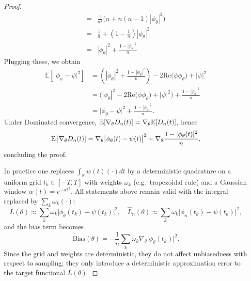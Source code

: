 \begin{proof}
\begin{align*}
=&
\frac{1}{n^2}\Big( n + n(n-1) |\phi_\theta|^2 \Big)\\
=&
\frac{1}{n} + \left(1-\frac{1}{n}\right)|\phi_\theta|^2\\
=&
|\phi_\theta|^2 + \frac{1-|\phi_\theta|^2}{n}
\end{align*}
Plugging these, we obtain
\begin{align*}
\mathbb{E}\left[ \big|\phi_n - \psi\big|^2 \right]
&=
\left( |\phi_\theta|^2 + \frac{1-|\phi_\theta|^2}{n} \right)
-
2\mathrm{Re}\big( \overline{\psi}\phi_\theta \big)
+
|\psi|^2
\\[4pt]
&=
\big( |\phi_\theta|^2 - 2\mathrm{Re}\big( \overline{\psi}\phi_\theta \big) + |\psi|^2 \big)
+
\frac{1-|\phi_\theta|^2}{n}
\\[4pt]
&=
\big|\phi_\theta - \psi\big|^2 + \frac{1-|\phi_\theta|^2}{n}.
\end{align*} 
Under Dominated convergence, $\mathbb{E}[\nabla_\theta D_n(t)] = \nabla_\theta \mathbb{E}[D_n(t)]$, hence
\[
\mathbb{E}\left[\nabla_\theta D_n(t)\right]
= \nabla_\theta \big|\phi_\theta(t)-\psi(t)\big|^2
+ \nabla_\theta \frac{1-|\phi_\theta(t)|^2}{n},
\]
concluding the proof. 


In practice one replaces $\int_{\mathbb{R}} w(t)(\cdot)dt$ by a deterministic quadrature on a uniform grid $t_k\in[-T,T]$ with weights $\omega_k$ (e.g.\ trapezoidal rule) and a Gaussian window $w(t)=e^{-\alpha t^2}$. All statements above remain valid with the integral replaced by $\sum_k \omega_k (\cdot)$:
\[
L(\theta) \approx \sum_{k} \omega_k\big|\phi_\theta(t_k)-\psi(t_k)\big|^2,
\quad
\widehat{L}_n(\theta) \approx \sum_{k} \omega_k\big|\phi_n(t_k)-\psi(t_k)\big|^2,
\]
and the bias term becomes
\[
\text{Bias}(\theta) = -\frac{1}{n}\sum_k \omega_k\nabla_\theta \big|\phi_\theta(t_k)\big|^2.
\]
Since the grid and weights are deterministic, they do not affect unbiasedness with respect to sampling; they only introduce a deterministic approximation error to the target functional $L(\theta)$.

\end{proof}










